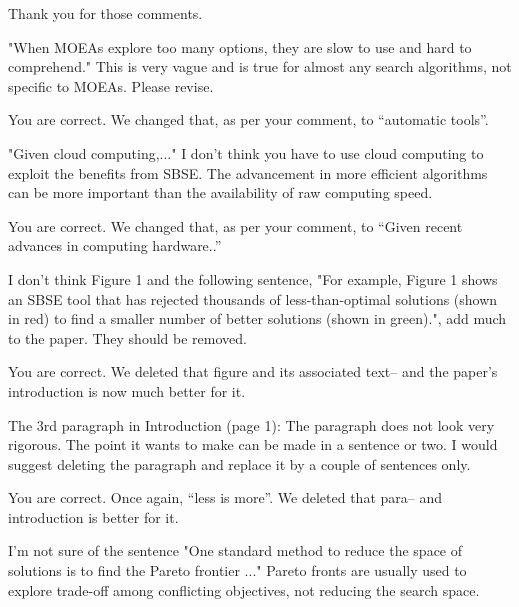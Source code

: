 \documentclass[10pt,journal,compsoc]{IEEEtran}
\newenvironment{changed}{\par}{\par}
\begin{document}
\begin{changed}
Thank you for those comments.
\end{changed}

"When MOEAs explore too many options, they are slow to use and hard to
comprehend." This is very vague and is true for almost any search
algorithms, not specific to MOEAs. Please revise.



\begin{changed}
You are correct. We changed that, as per your comment, to ``automatic tools''.
\end{changed}


"Given cloud computing,..." I don't think you have to use cloud
computing to exploit the benefits from SBSE. The advancement in more
efficient algorithms can be more important than the availability of raw
computing speed.


\begin{changed}
You are correct. We changed that, as per your comment, to ``Given recent advances in computing hardware..''
\end{changed}

I don't think Figure 1 and the following sentence, "For example, Figure
1 shows an SBSE tool that has rejected thousands of less-than-optimal
solutions (shown in red) to find a smaller number of better solutions
(shown in green).", add much to the paper. They should be removed.


\begin{changed}
You are correct. We deleted that figure and its associated text-- and the paper's introduction is now much better for it.
\end{changed}

 The 3rd paragraph in Introduction (page 1): The paragraph
does not look very rigorous. The
point it wants to make can be made in a sentence or two. I would suggest
deleting the paragraph and replace it by a couple of sentences only.


\begin{changed}
You are correct. Once again, ``less is more''.
We deleted that para-- and introduction is better for it.
\end{changed}

I'm not sure of the sentence "One standard method to reduce the
space of solutions is to find the Pareto frontier ..." Pareto fronts are
usually used to explore trade-off among conflicting objectives, not
reducing the search space.
\end{document}
